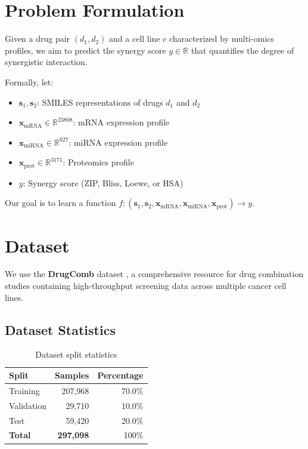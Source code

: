 \documentclass[10pt,twocolumn]{article}
\begin{document}
\section{Problem Formulation}

Given a drug pair $(d_1, d_2)$ and a cell line $c$ characterized by multi-omics profiles, we aim to predict the synergy score $y \in \mathbb{R}$ that quantifies the degree of synergistic interaction.

Formally, let:
\begin{itemize}
    \item $\mathbf{s}_1, \mathbf{s}_2$: SMILES representations of drugs $d_1$ and $d_2$
    \item $\mathbf{x}_{\text{mRNA}} \in \mathbb{R}^{23808}$: mRNA expression profile
    \item $\mathbf{x}_{\text{miRNA}} \in \mathbb{R}^{627}$: miRNA expression profile  
    \item $\mathbf{x}_{\text{prot}} \in \mathbb{R}^{3171}$: Proteomics profile
    \item $y$: Synergy score (ZIP, Bliss, Loewe, or HSA)
\end{itemize}

Our goal is to learn a function $f: (\mathbf{s}_1, \mathbf{s}_2, \mathbf{x}_{\text{mRNA}}, \mathbf{x}_{\text{miRNA}}, \mathbf{x}_{\text{prot}}) \rightarrow y$.

\section{Dataset}

We use the \textbf{DrugComb} dataset \cite{drugcomb}, a comprehensive resource for drug combination studies containing high-throughput screening data across multiple cancer cell lines.

\subsection{Dataset Statistics}

\begin{table}[h]
\centering
\caption{Dataset split statistics}
\label{tab:dataset}
\begin{tabular}{@{}lrr@{}}
\toprule
\textbf{Split} & \textbf{Samples} & \textbf{Percentage} \\
\midrule
Training & 207,968 & 70.0\% \\
Validation & 29,710 & 10.0\% \\
Test & 59,420 & 20.0\% \\
\midrule
\textbf{Total} & \textbf{297,098} & 100\% \\
\bottomrule
\end{tabular}
\end{table}
\end{document}
